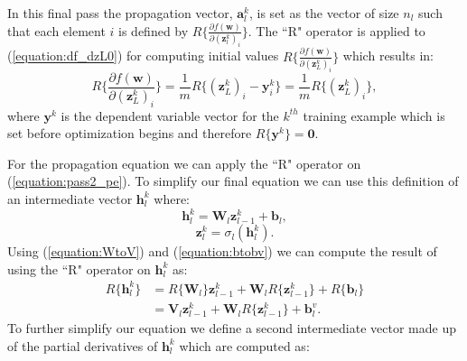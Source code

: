 \documentclass[letterpaper,12pt,titlepage,oneside,final]{book}
\begin{document}
	In this final pass the propagation vector, $\mathbf{a}_{l}^{k}$, is set as the vector of size $n_{l}$ such that each element $i$ is defined by $R\{\frac{\partial{f(\mathbf{w})}}{\partial{(\mathbf{z}_{l}^{k})_{i}}}\}$. The ``R" operator is applied to (\ref{equation:df_dzL0}) for computing initial values $R\{\frac{\partial{f(\mathbf{w})}}{\partial{(\mathbf{z}_{L}^{k})_{i}}}\}$ which results in:
	\begin{equation}
	R\{\frac{\partial{f(\mathbf{w})}}{\partial{(\mathbf{z}_{L}^{k})_{i}}}\} = \frac{1}{m}R\{(\mathbf{z}_{L}^{k})_{i} - \mathbf{y}_{i}^{k}\} = \frac{1}{m}R\{(\mathbf{z}_{L}^{k})_{i}\},
	\end{equation}
	where $\mathbf{y}^{k}$ is the dependent variable vector for the $k^{th}$ training example which is set before optimization begins and therefore $R\{\mathbf{y}^{k}\} = \mathbf{0}$.
	
	For the propagation equation we can apply the ``R" operator on (\ref{equation:pass2_pe}). To simplify our final equation we can use this definition of an intermediate vector $\mathbf{h}_{l}^{k}$ where:
	\begin{equation}
	\mathbf{h}_{l}^{k} = \mathbf{W}_{l}\mathbf{z}_{l-1}^{k} + \mathbf{b}_{l},
	\end{equation}
	\begin{equation}
	\mathbf{z}_{l}^{k} = \sigma_{l}(\mathbf{h}_{l}^{k}).
	\end{equation}
	Using (\ref{equation:WtoV}) and (\ref{equation:btobv}) we can compute the result of using the ``R" operator on $\mathbf{h}_{l}^{k}$ as:
	\begin{equation}
	\begin{split}
	R\{\mathbf{h}_{l}^{k}\} & = R\{\mathbf{W}_{l}\}\mathbf{z}_{l-1}^{k} + \mathbf{W}_{l}R\{\mathbf{z}_{l-1}^{k}\} + R\{\mathbf{b}_{l}\}\\
	& = \mathbf{V}_{l}\mathbf{z}_{l-1}^{k} + \mathbf{W}_{l}R\{\mathbf{z}_{l-1}^{k}\} + \mathbf{b}_{l}^{v}.
	\label{equation:rh}
	\end{split}
	\end{equation}
	To further simplify our equation we define a second intermediate vector made up of the partial derivatives of $\mathbf{h}_{l}^{k}$ which are computed as:
	
\end{document}
